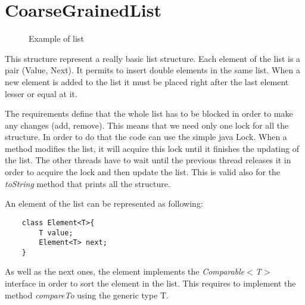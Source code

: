 \section{CoarseGrainedList}
\label{coarsegrainedlist}

\begin{figure}[H]
	\centering
{}
	\caption{Example of list}
	\label{fig:list}
\end{figure}

This structure represent a really basic list structure. Each element of the list is a pair (Value, Next). It permits to insert double elements in the same list. When a new element is added to the list it must be placed right after the last element lesser or equal at it.\newline

The requirements define that the whole list has to be blocked in order to make any changes (add, remove). This means that we need only one lock for all the structure. In order to do that the code can use the simple java Lock. When a method modifies the list, it will acquire this lock until it finishes the updating of the list. The other threads have to wait until the previous thread releases it in order to acquire the lock and then update the list. This is valid also for the \emph{toString} method that prints all the structure.\newline


An element of the list can be represented as following:\newline

\begin{lstlisting}
	class Element<T>{
		T value;
		Element<T> next;
	}
\end{lstlisting}

As well as the next ones, the element implements the \emph{Comparable$<$T$>$} interface in order to sort the element in the list. This requires to implement the method \emph{compareTo} using the generic type T.

